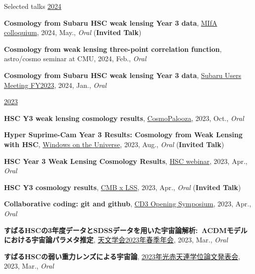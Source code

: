 \begin{rSection}{Selected talks}
\underline{2024}
\begin{etaremune}
\setcounter{enumi}{34}
\item \textbf{Cosmology from Subaru HSC weak lensing Year 3 data}, \href{https://cse.umn.edu/physics/minnesota-institute-astrophysics-mifa-colloquium}{MIfA colloquium}, 2024, May., \textit{Oral} (\textbf{Invited Talk})
\item \textbf{Cosmology from weak lensing three-point correlation function}, astro/cosmo seminar at CMU, 2024, Feb., \textit{Oral}
\item \textbf{Cosmology from Subaru HSC weak lensing Year 3 data}, \href{https://www.subarutelescope.org/Science/SubaruUM/SubaruUM2023/index.html}{Subaru Users Meeting FY2023}, 2024, Jan., \textit{Oral}
\end{etaremune}

\underline{2023}
\begin{etaremune}
\setcounter{enumi}{31}
\item \textbf{HSC Y3 weak lensing cosmology results}, \href{http://vietnam.in2p3.fr/2023/windows/index.html}{CosmoPalooza}, 2023, Oct., \textit{Oral}
\item \textbf{Hyper Suprime-Cam Year 3 Results: Cosmology from Weak Lensing with HSC}, \href{http://vietnam.in2p3.fr/2023/windows/index.html}{Windows on the Universe}, 2023, Aug., \textit{Oral} (\textbf{Invited Talk})
\item \textbf{HSC Year 3 Weak Lensing Cosmology Results}, \href{https://hsc-release.mtk.nao.ac.jp/doc/index.php/wly3/}{HSC webinar}, 2023, Apr., \textit{Oral}
\item \textbf{HSC Y3 cosmology results}, \href{https://www2.yukawa.kyoto-u.ac.jp/~cmb-lss/index.php}{CMB x LSS}, 2023, Apr., \textit{Oral} (\textbf{Invited Talk})
\item \textbf{Collaborative coding: git and github}, \href{https://cd3.ipmu.jp/opening/}{CD3 Opening Symposium}, 2023, Apr., \textit{Oral}
\item \textbf{すばるHSCの3年度データとSDSSデータを用いた宇宙論解析: ΛCDMモデルにおける宇宙論パラメタ推定}, \href{https://www.asj.or.jp/nenkai/archive/2023a/pdf/U20a.pdf}{天文学会2023年春季年会}, 2023, Mar., \textit{Oral}
\item \textbf{すばるHSCの弱い重力レンズによる宇宙論}, \href{http://gopira.jp/Dthesis2022/program.html}{2023年光赤天連学位論文発表会}, 2023, Mar., \textit{Oral}
\end{etaremune}


\end{rSection}
